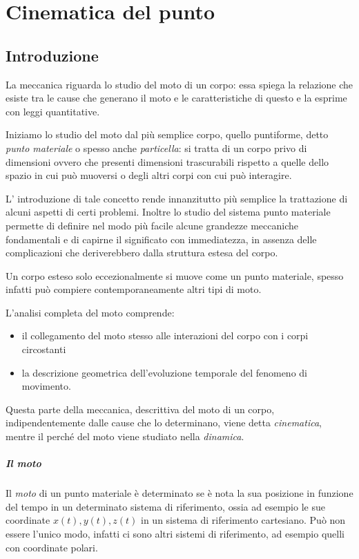 \documentclass[class=book, crop=false, oneside, 12pt]{standalone}
\begin{document}
\chapter{Cinematica del punto}

\section{Introduzione}

La meccanica riguarda lo studio del moto di un corpo: essa spiega la
relazione che esiste tra le cause che generano il moto e le
caratteristiche di questo e la esprime con leggi quantitative.

Iniziamo lo studio del moto dal più semplice corpo, quello puntiforme,
detto \emph{punto materiale} o spesso anche \emph{particella}: si tratta
di un corpo privo di dimensioni ovvero che presenti dimensioni
trascurabili rispetto a quelle dello spazio in cui può muoversi o degli
altri corpi con cui può interagire.

L' introduzione di tale concetto rende innanzitutto più semplice la
trattazione di alcuni aspetti di certi problemi. Inoltre lo studio del
sistema punto materiale permette di definire nel modo più facile alcune
grandezze meccaniche fondamentali e di capirne il significato con
immediatezza, in assenza delle complicazioni che deriverebbero dalla
struttura estesa del corpo.

Un corpo esteso solo eccezionalmente si muove come un punto materiale,
spesso infatti può compiere contemporaneamente altri tipi di moto.

L'analisi completa del moto comprende:

\begin{itemize}
\item
  il collegamento del moto stesso alle interazioni del corpo con i corpi
  circostanti
\item
  la descrizione geometrica dell'evoluzione temporale del fenomeno di
  movimento.
\end{itemize}

Questa parte della meccanica, descrittiva del moto di un corpo,
indipendentemente dalle cause che lo determinano, viene detta
\emph{cinematica}, mentre il perché del moto viene studiato nella
\emph{dinamica}.

\paragraph{Il moto}
Il \emph{moto} di un punto materiale è determinato se è nota la sua posizione
in funzione del tempo in un determinato sistema di riferimento, ossia ad
esempio le sue coordinate \(x(t), y(t),z(t)\) in un sistema di
riferimento cartesiano. Può non essere l'unico modo, infatti ci sono
altri sistemi di riferimento, ad esempio quelli con coordinate polari.
\end{document}
